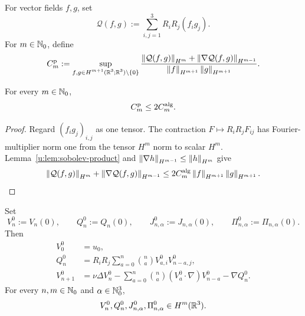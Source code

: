 \begin{definition}
\label{u:def:formal-canonical-bilinear-constants}
For vector fields \(f,g\), set
\[
 \mathcal Q(f,g):=\sum_{i,j=1}^3R_iR_j(f_i g_j).
\]
For \(m\in\mathbb N_0\), define
\[
 C_m^{\rm p}:=
 \sup_{\substack{
 f,g\in H^{m+1}(\mathbb R^3;\mathbb R^3)\setminus\{0\}}}
 \frac{
 \left\lVert \mathcal Q(f,g)\right\rVert_{H^m}
 +\left\lVert \nabla\mathcal Q(f,g)\right\rVert_{H^{m-1}}}
 {\left\lVert f\right\rVert_{H^{m+1}}\left\lVert g\right\rVert_{H^{m+1}}}.
\]
\end{definition}

\begin{lemma}
\label{u:lem:formal-canonical-bilinear-constants}
For every \(m\in\mathbb N_0\),
\[
 C_m^{\rm p}\le2C_m^{\rm alg}.
\]
\end{lemma}
\begin{proof}
Regard \((f_i g_j)_{i,j}\) as one tensor.  The contraction
\(F\mapsto R_iR_jF_{ij}\) has Fourier-multiplier norm one from the tensor
\(H^m\) norm to scalar \(H^m\).  Lemma~\ref{u:lem:sobolev-product} and
\(\left\lVert \nabla h\right\rVert_{H^{m-1}}\le\left\lVert h\right\rVert_{H^m}\) give
\[
 \left\lVert \mathcal Q(f,g)\right\rVert_{H^m}
 +\left\lVert \nabla\mathcal Q(f,g)\right\rVert_{H^{m-1}}
 \le2C_m^{\rm alg}\left\lVert f\right\rVert_{H^{m+1}}\left\lVert g\right\rVert_{H^{m+1}}.
\]
\end{proof}

\begin{lemma}
\label{u:lem:formal-initial-jet}
Set
\[
 V_n^0:=V_n(0),
 \qquad
 Q_n^0:=Q_n(0),
 \qquad
 J_{n,\alpha}^0:=J_{n,\alpha}(0),
 \qquad
 \Pi_{n,\alpha}^0:=\Pi_{n,\alpha}(0).
\]
Then
\begin{align}
 V_0^0&=u_0,
 \label{u:eq:formal-initial-base}\\
 Q_n^0
 &=R_iR_j
 \sum_{a=0}^{n}\binom naV_{a,i}^0V_{n-a,j}^0,
 \label{u:eq:formal-initial-pressure}\\
 V_{n+1}^0
 &=
 \nu\Delta V_n^0
 -\sum_{a=0}^{n}\binom na
 (V_a^0\cdot\nabla)V_{n-a}^0
 -\nabla Q_n^0.
 \label{u:eq:formal-initial-velocity}
\end{align}
For every \(n,m\in\mathbb N_0\) and \(\alpha\in\mathbb N_0^3\),
\[
 V_n^0,Q_n^0,J_{n,\alpha}^0,\Pi_{n,\alpha}^0\in H^m(\mathbb R^3).
\]
\par
\end{lemma}

